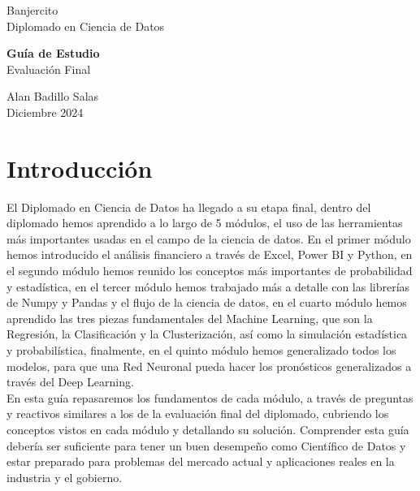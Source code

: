 \documentclass{article}
\begin{document}
\begin{flushleft}
    \LARGE Banjercito \\[6pt]
    \Large Diplomado en Ciencia de Datos
\end{flushleft}

\vfill

\begin{flushleft}
    \LARGE \textbf{Guía de Estudio} \\[12pt]
    \LARGE Evaluación Final \\[24pt]
\end{flushleft}

\vfil

\begin{flushleft}
    Alan Badillo Salas \\[12pt]
    \scriptsize Diciembre 2024 \\[24pt]
\end{flushleft}

\vfill

\section*{Introducción}

El Diplomado en Ciencia de Datos ha llegado a su etapa final, dentro del diplomado hemos aprendido a lo largo de 5 módulos, el uso de las herramientas más importantes usadas en el campo de la ciencia de datos. En el primer módulo hemos introducido el análisis financiero a través de Excel, Power BI y Python, en el segundo módulo hemos reunido los conceptos más importantes de probabilidad y estadística, en el tercer módulo hemos trabajado más a detalle con las librerías de Numpy y Pandas y el flujo de la ciencia de datos, en el cuarto módulo hemos aprendido las tres piezas fundamentales del Machine Learning, que son la Regresión, la Clasificación y la Clusterización, así como la simulación estadística y probabilística, finalmente, en el quinto módulo hemos generalizado todos los modelos, para que una Red Neuronal pueda hacer los pronósticos generalizados a través del Deep Learning.
\\[12pt]
En esta guía repasaremos los fundamentos de cada módulo, a través de preguntas y reactivos similares a los de la evaluación final del diplomado, cubriendo los conceptos vistos en cada módulo y detallando su solución. Comprender esta guía debería ser suficiente para tener un buen desempeño como Científico de Datos y estar preparado para problemas del mercado actual y aplicaciones reales en la industria y el gobierno.
\end{document}
